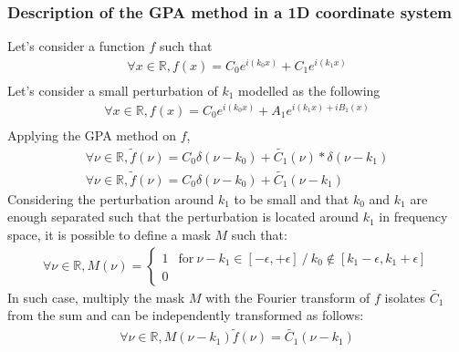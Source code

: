 \documentclass[12pt]{article}
\begin{document}
\subsubsection*{Description of the GPA method in a 1D coordinate system}
\noindent Let's consider a function $f$ such that 
\begin{equation*}
\begin{gathered}
\forall x \in \mathbb{R}, f(x)=C_0e^{i(k_0x)}+C_1e^{i(k_1x)} \\
\end{gathered}
\end{equation*}
Let's consider a small perturbation of $k_1$ modelled as the following
\begin{equation*}
\begin{gathered}
\forall x \in \mathbb{R}, f(x)=C_0e^{i(k_0x)}+A_1e^{i(k_1x)+iB_1(x)} \\
\end{gathered}
\end{equation*}
Applying the GPA method on $f$,
\begin{equation*}
\begin{gathered}
\forall \nu \in \mathbb{R}, \widetilde{f}(\nu)=C_0\delta(\nu-k_0)+\widetilde{C_1}(\nu)\ast\delta(\nu-k_1) \\
\forall \nu \in \mathbb{R}, \widetilde{f}(\nu)=C_0\delta(\nu-k_0)+\widetilde{C_1}(\nu-k_1)
\end{gathered}
\end{equation*}
Considering the perturbation around $k_1$ to be small and that $k_0$ and $k_1$ are enough separated such that the perturbation is located around $k_1$ in frequency space, it is possible to define a mask $M$ such that:
\begin{equation*}
\begin{gathered}
\forall \nu \in \mathbb{R}, M(\nu) = 
\begin{cases}
1 & \text{for} \ \nu-k_1 \in  [-\epsilon,+\epsilon] \ / \ k_0 \notin [k_1-\epsilon,k_1+\epsilon] \\
0
\end{cases}
\end{gathered}
\end{equation*}
In such case, multiply the mask $M$ with the Fourier transform of $f$ isolates $\widetilde{C_1}$ from the sum and can be independently transformed as follows:
\begin{equation*}
\begin{gathered}
\forall \nu \in \mathbb{R}, M(\nu-k_1)\widetilde{f}(\nu)=\widetilde{C_1}(\nu-k_1)
\end{gathered}
\end{equation*}
\end{document}
